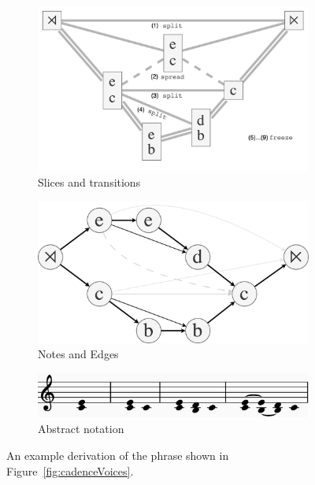 \documentclass[12pt,a4paper,twoside,openany]{report} \usepackage[pdfborder={0 0 0}]{hyperref}    %
\theoremstyle{definition} \newtheorem{definition}{Definition}[section]
\begin{document}
\begin{figure}[h] \centering \begin{subfigure}[t]{.5\textwidth}
  \centering\includegraphics[keepaspectratio,width=\textwidth]{prep/cadenceouterder.png} \caption{Slices and
  transitions} \label{fig:cadenceOuterDer} \end{subfigure} \begin{subfigure}[t]{.42\textwidth}
  \centering\includegraphics[keepaspectratio,width=\textwidth]{prep/cadenceinnerder.png} \caption{Notes and Edges}
  \label{fig:cadenceInnerDer} \end{subfigure} \begin{subfigure}[t]{.8\textwidth}
\centering\includegraphics[keepaspectratio,width=\textwidth]{prep/cadencederivation.png} \caption{Abstract notation}
\label{fig:cadenceDerivation} \end{subfigure}
\captionsetup{width=.9\linewidth} 
\caption{An example derivation of the phrase shown in Figure~\ref{fig:cadenceVoices}.
} \label{fig:innerOuterStructure} 
\end{figure}
\end{document}
